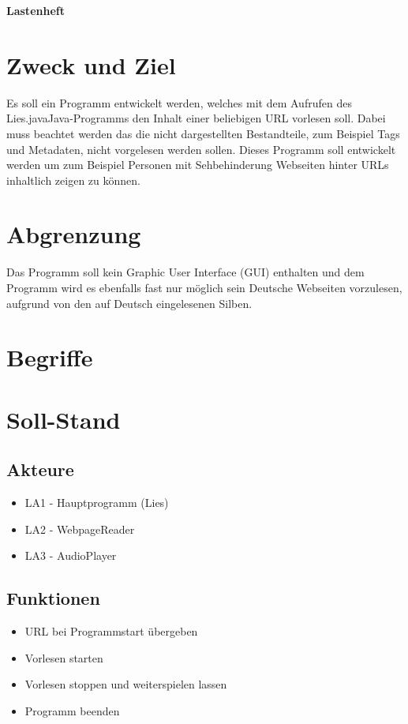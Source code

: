 \documentclass[11pt]{scrartcl}
\begin{document}
\begin{center}
\textbf{Lastenheft}
\end{center}

\section{Zweck und Ziel}
Es soll ein Programm entwickelt werden, welches mit dem Aufrufen des \glqq Lies.java\grqq Java-Programms den Inhalt einer beliebigen URL vorlesen soll. Dabei muss beachtet werden das die nicht dargestellten Bestandteile, zum Beispiel Tags und Metadaten, nicht vorgelesen werden sollen. Dieses Programm soll entwickelt werden um zum Beispiel Personen mit Sehbehinderung Webseiten hinter URLs inhaltlich zeigen zu können.

\section{Abgrenzung}
Das Programm soll kein Graphic User Interface (GUI) enthalten und dem Programm wird es ebenfalls fast nur möglich sein Deutsche Webseiten vorzulesen, aufgrund von den auf Deutsch eingelesenen Silben.

\section{Begriffe}


\section{Soll-Stand}


\subsection{Akteure}

\begin{itemize}
	\item LA1 - Hauptprogramm (Lies)
	\item LA2 - WebpageReader
	\item LA3 - AudioPlayer
\end{itemize}

\subsection{Funktionen}

\begin{itemize}
	\item URL bei Programmstart übergeben
	\item Vorlesen starten
	\item Vorlesen stoppen und weiterspielen lassen
	\item Programm beenden
\end{itemize}
\end{document}
